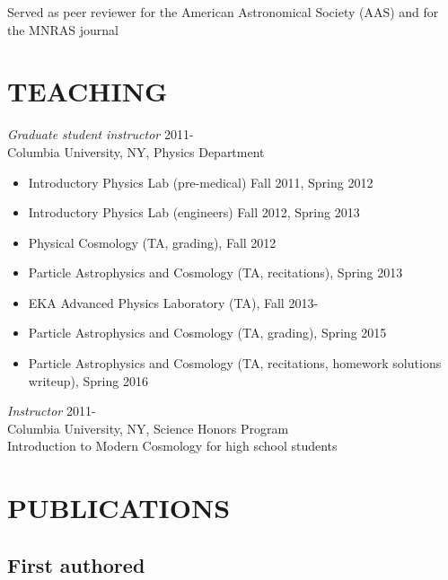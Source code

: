 \documentclass[margin]{res} %
\begin{document}
\begin{resume}
Served as peer reviewer for the American Astronomical Society (AAS) and for the MNRAS journal

\section{TEACHING} 
{\sl Graduate student instructor} \hfill 2011-\\ 
Columbia University, NY, Physics Department 
\begin{itemize}
\item Introductory Physics Lab (pre-medical) Fall 2011, Spring 2012
\item Introductory Physics Lab (engineers) Fall 2012, Spring 2013
\item Physical Cosmology (TA, grading), Fall 2012
\item Particle Astrophysics and Cosmology (TA, recitations), Spring 2013 
\item EKA Advanced Physics Laboratory (TA), Fall 2013-
\item Particle Astrophysics and Cosmology (TA, grading), Spring 2015
\item Particle Astrophysics and Cosmology (TA, recitations, homework solutions writeup), Spring 2016
\end{itemize}

{\sl Instructor} \hfill 2011- \\
Columbia University, NY, Science Honors Program\\
Introduction to Modern Cosmology for high school students

\section{PUBLICATIONS}

\subsection{First authored}

\begin{enumerate}


\end{enumerate}
\end{resume}
\end{document}

